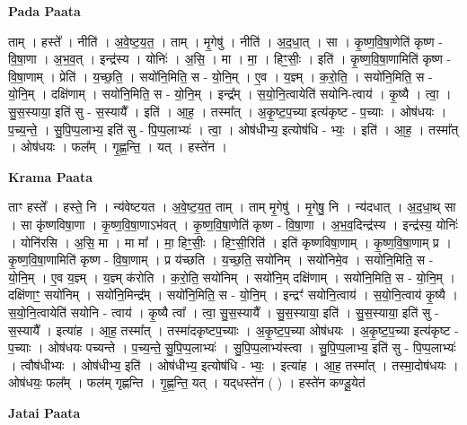 \documentclass[17pt]{extarticle}
\begin{document}
\textbf{Pada Paata} \newline

ताम् । हस्ते᳚ । नीति॑ । अ॒वे॒ष्ट॒य॒त॒ । ताम् । मृ॒गेषु॑ । नीति॑ । अ॒द॒धा॒त् । सा । कृ॒ष्ण॒वि॒षा॒णेति॑ कृष्ण - वि॒षा॒णा । अ॒भ॒व॒त् । इन्द्र॑स्य । योनिः॑ । अ॒सि॒ । मा । मा॒ । हिꣳ॒॒सीः॒ । इति॑ । कृ॒ष्ण॒वि॒षा॒णामिति॑ कृष्ण - वि॒षा॒णाम् । प्रेति॑ । य॒च्छ॒ति॒ । सयो॑नि॒मिति॒ स - यो॒नि॒म् । ए॒व । य॒ज्ञ्म् । क॒रो॒ति॒ । सयो॑नि॒मिति॒ स - यो॒नि॒म् । दक्षि॑णाम् । सयो॑नि॒मिति॒ स - यो॒नि॒म् । इन्द्र᳚म् । स॒यो॒नि॒त्वायेति॑ सयोनि-त्वाय॑ । कृ॒ष्यै । त्वा॒ । सु॒स॒स्याया॒ इति॑ सु - स॒स्यायै᳚ । इति॑ । आ॒ह॒ । तस्मा᳚त् । अ॒कृ॒ष्ट॒प॒च्या इत्य॑कृष्ट - प॒च्याः । ओष॑धयः । प॒च्य॒न्ते॒ । सु॒पि॒प्प॒लाभ्य॒ इति॑ सु - पि॒प्प॒लाभ्यः॑ । त्वा॒ । ओष॑धीभ्य॒ इत्योष॑धि - भ्यः॒ । इति॑ । आ॒ह॒ । तस्मा᳚त् । ओष॑धयः । फल᳚म् । गृ॒ह्ण॒न्ति॒ । यत् । हस्ते॑न ।  \newline


\textbf{Krama Paata} \newline

ताꣳ हस्ते᳚ । हस्ते॒ नि । न्य॑वेष्टयत । अ॒वे॒ष्ट॒य॒त॒ ताम् । ताम् मृ॒गेषु॑ । मृ॒गेषु॒ नि । न्य॑दधात् । अ॒द॒धा॒थ् सा । सा कृ॑ष्णविषा॒णा । कृ॒ष्ण॒वि॒षा॒णाऽभ॑वत् । कृ॒ष्ण॒वि॒षा॒णेति॑ कृष्ण - वि॒षा॒णा । अ॒भ॒व॒दिन्द्र॑स्य । इन्द्र॑स्य॒ योनिः॑ । योनि॑रसि । अ॒सि॒ मा । मा मा᳚ । मा॒ हिꣳ॒॒सीः॒ । हिꣳ॒॒सी॒रिति॑ । इति॑ कृष्णविषा॒णाम् । कृ॒ष्ण॒वि॒षा॒णाम् प्र । कृ॒ष्ण॒वि॒षा॒णामिति॑ कृष्ण - वि॒षा॒णाम् । प्र य॑च्छति । य॒च्छ॒ति॒ सयो॑निम् । सयो॑निमे॒व । सयो॑नि॒मिति॒ स - यो॒नि॒म् । ए॒व य॒ज्ञ्म् । य॒ज्ञ्म् क॑रोति । क॒रो॒ति॒ सयो॑निम् । सयो॑नि॒म् दक्षि॑णाम् । सयो॑नि॒मिति॒ स - यो॒नि॒म् । दक्षि॑णाꣳ॒॒ सयो॑निम् । सयो॑नि॒मिन्द्र᳚म् । सयो॑नि॒मिति॒ स - यो॒नि॒म् । इन्द्रꣳ॑ सयोनि॒त्वाय॑ । स॒यो॒नि॒त्वाय॑ कृ॒ष्यै । स॒यो॒नि॒त्वायेति॑ सयोनि - त्वाय॑ । कृ॒ष्यै त्वा᳚ । त्वा॒ सु॒स॒स्यायै᳚ । सु॒स॒स्याया॒ इति॑ । सु॒स॒स्याया॒ इति॑ सु - स॒स्यायै᳚ । इत्या॑ह । आ॒ह॒ तस्मा᳚त् । तस्मा॑दकृष्टप॒च्याः । अ॒कृ॒ष्ट॒प॒च्या ओष॑धयः । अ॒कृ॒ष्ट॒प॒च्या इत्य॑कृष्ट - प॒च्याः । ओष॑धयः पच्यन्ते । प॒च्य॒न्ते॒ सु॒पि॒प्प॒लाभ्यः॑ । सु॒पि॒प्प॒लाभ्य॑स्त्वा । सु॒पि॒प्प॒लाभ्य॒ इति॑ सु - पि॒प्प॒लाभ्यः॑ । त्वौष॑धीभ्यः । ओष॑धीभ्य॒ इति॑ । ओष॑धीभ्य॒ इत्योष॑धि - भ्यः॒ । इत्या॑ह । आ॒ह॒ तस्मा᳚त् । तस्मा॒दोष॑धयः । ओष॑धयः॒ फल᳚म् । फल॑म् गृह्णन्ति । गृ॒ह्ण॒न्ति॒ यत् । यद्‍धस्ते॑न ( ) । हस्ते॑न कण्डू॒येत॑ \newline

\textbf{Jatai Paata} \newline
\end{document}
